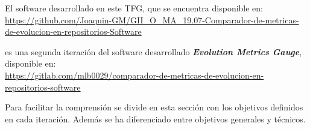 

El software desarrollado en este TFG, que se encuentra disponible en:\\
\url{https://github.com/Joaquin-GM/GII_O_MA_19.07-Comparador-de-metricas-de-evolucion-en-repositorios-Software}

es una segunda iteración del software desarrollado \textit{\textbf{Evolution Metrics Gauge}}, disponible en: \\
\url{https://gitlab.com/mlb0029/comparador-de-metricas-de-evolucion-en-repositorios-software}
  
Para facilitar la comprensión se divide en esta sección con los objetivos definidos en cada iteración. Además se ha diferenciado entre objetivos generales y técnicos.

